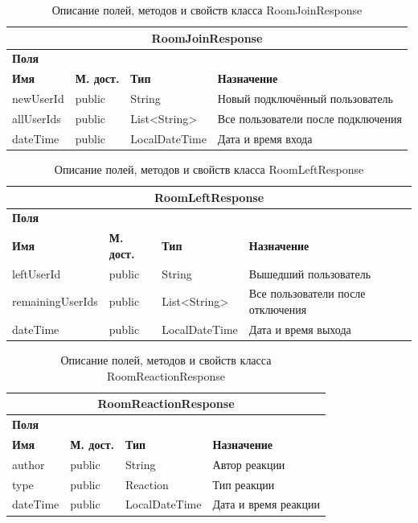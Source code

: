 \documentclass{../includes/TechDoc}
\begin{document}
    \begin{table}[h]
		\caption{\label{tab:class-WebsocketEventListener-table}Описание полей, методов и свойств класса RoomJoinResponse}
	    \begin{tabularx}{\textwidth}{|l|l|l|X|}
	    	\hline
	  		\multicolumn{4}{|c|}{RoomJoinResponse} \\ \hline
	  		\multicolumn{4}{|l|}{\textbf{Поля}} \\ \hline
	  		\textbf{Имя} & \textbf{М. дост.} & \textbf{Тип} & \textbf{Назначение} \\ \hline
			newUserId & public & String & Новый подключённый пользователь \\ \hline
			allUserIds & public & List<String> & Все пользователи после подключения \\ \hline
			dateTime & public & LocalDateTime & Дата и время входа \\ \hline
		\end{tabularx}
    \end{table}

    \begin{table}[h]
		\caption{\label{tab:class-WebsocketEventListener-table}Описание полей, методов и свойств класса RoomLeftResponse}
	    \begin{tabularx}{\textwidth}{|l|l|l|X|}
	    	\hline
	  		\multicolumn{4}{|c|}{RoomLeftResponse} \\ \hline
	  		\multicolumn{4}{|l|}{\textbf{Поля}} \\ \hline
	  		\textbf{Имя} & \textbf{М. дост.} & \textbf{Тип} & \textbf{Назначение} \\ \hline
			leftUserId & public & String & Вышедший пользователь \\ \hline
			remainingUserIds & public & List<String> & Все пользователи после отключения \\ \hline
			dateTime & public & LocalDateTime & Дата и время выхода \\ \hline
		\end{tabularx}
    \end{table}

    \begin{table}[h]
		\caption{\label{tab:class-WebsocketEventListener-table}Описание полей, методов и свойств класса RoomReactionResponse}
	    \begin{tabularx}{\textwidth}{|l|l|l|X|}
	    	\hline
	  		\multicolumn{4}{|c|}{RoomReactionResponse} \\ \hline
	  		\multicolumn{4}{|l|}{\textbf{Поля}} \\ \hline
	  		\textbf{Имя} & \textbf{М. дост.} & \textbf{Тип} & \textbf{Назначение} \\ \hline
			author & public & String & Автор реакции \\ \hline
			type & public & Reaction & Тип реакции \\ \hline
			dateTime & public & LocalDateTime & Дата и время реакции \\ \hline
		\end{tabularx}
    \end{table}
\end{document}
